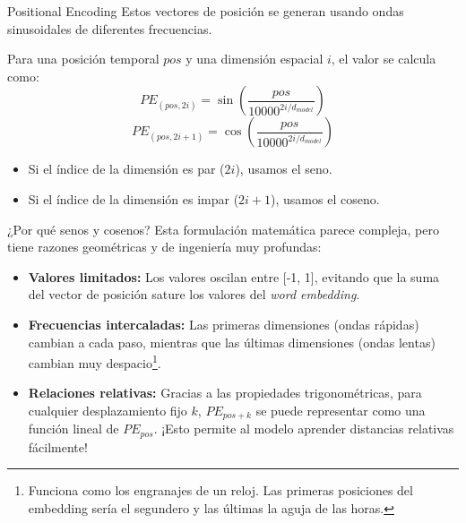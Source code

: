 \begin{frame}{Positional Encoding}
Estos vectores de posición se generan usando \alert{ondas sinusoidales} de diferentes frecuencias.

Para una posición temporal $pos$ y una dimensión espacial $i$, el valor se calcula como:
\begin{equation}
PE_{(pos, 2i)} = \sin\left(\frac{pos}{10000^{2i/d_{model}}}\right)
\end{equation}
\begin{equation}
PE_{(pos, 2i+1)} = \cos\left(\frac{pos}{10000^{2i/d_{model}}}\right) 
\end{equation}

\begin{itemize}
    \item Si el índice de la dimensión es par ($2i$), usamos el \alert{seno}.
    \item Si el índice de la dimensión es impar ($2i+1$), usamos el \alert{coseno}.
\end{itemize}
\end{frame}

\begin{frame}{¿Por qué senos y cosenos?}
Esta formulación matemática parece compleja, pero tiene razones geométricas y de ingeniería muy profundas:

\begin{itemize}
    \item \textbf{Valores limitados:} Los valores oscilan entre [-1, 1], evitando que la suma del vector de posición \alert{sature los valores} del \textit{word embedding}.
    \item \textbf{Frecuencias intercaladas:} Las primeras dimensiones (ondas rápidas) cambian a \alert{cada paso}, mientras que las últimas dimensiones (ondas lentas) cambian \alert{muy despacio}\footnote{Funciona como los engranajes de un reloj. Las primeras posiciones del embedding sería el segundero y las últimas la aguja de las horas.}.
    \item \textbf{Relaciones relativas:} Gracias a las propiedades trigonométricas, para cualquier desplazamiento fijo $k$, $PE_{pos+k}$ se puede representar como una función lineal de $PE_{pos}$. ¡Esto permite al modelo aprender \alert{distancias relativas} fácilmente!
\end{itemize}
\end{frame}

